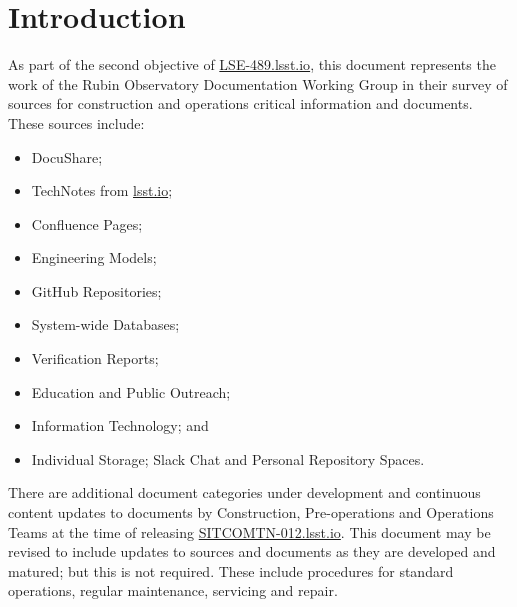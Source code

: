 \section {Introduction}

As part of the second objective of \url{LSE-489.lsst.io}, this document represents the work of the Rubin Observatory Documentation Working Group in their survey of sources for construction and operations critical information and documents.  These sources include:

\begin{itemize}
	\item DocuShare;
	\item TechNotes from \url{lsst.io};
	\item Confluence Pages;
	\item Engineering Models; 
	\item GitHub Repositories;
	\item System-wide Databases;
	\item Verification Reports;
	\item Education and Public Outreach; 
	\item Information Technology; and
	\item Individual Storage; Slack Chat and Personal Repository Spaces.
\end{itemize}
	
There are additional document categories under development and continuous content updates to documents by Construction, Pre-operations and Operations Teams at the time of releasing \url{SITCOMTN-012.lsst.io}. This document may be revised to include updates to sources and documents as they are developed and matured; but this is not required. These include procedures for standard operations, regular maintenance, servicing and repair.
